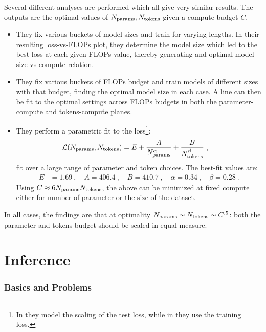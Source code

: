 \documentclass[11pt]{article}
\begin{document}
Several different analyses are performed which all give very similar results. The outputs are the optimal values of $ N _{ {\rm params} }, N _{ {\rm tokens} } $ given a compute budget $ C $.
\begin{itemize}
	\item They fix various buckets of model sizes and train for varying lengths. In their resulting
	      loss-vs-FLOPs plot, they determine the model size which led to the best loss at each given FLOPs value, thereby generating
	      and optimal model size vs compute relation.
	\item They fix various buckets of FLOPs budget and train models of different sizes with that budget,
	      finding the optimal model size in each case. A line can then be fit to the optimal settings across
	      FLOPs budgets in both the parameter-compute and tokens-compute planes.
	\item  They perform a parametric fit to the loss\footnote{In \cite{hoffmann2022training} they model
		      the scaling of the test loss, while in \cite{kaplan2020scaling} they use the training loss.}:
	      \begin{align}
		      \mathcal{L} (N _{ {\rm params} }, N _{ {\rm tokens} }) & =E + \frac{ A }{ N _{ {\rm  params} } ^{ \alpha  } }  + \frac{ B }{ N _{ {\rm tokens} } ^{ \beta  } } \label{eq_chinchilla} \ ,
	      \end{align}
	      fit over a large range of parameter and token choices. The best-fit values are:
	      \begin{align}
		      E & = 1.69 \ , \quad A = 406.4 \ , \quad B = 410.7 \ , \quad  \alpha = 0.34 \ , \quad \beta =0.28 \ .
	      \end{align}
	      Using $ C \approx 6 N _{ {\rm params}} N _{ {\rm tokens} } $, the above can be minimized at fixed compute
	      either for number of parameter or the size of the dataset.
\end{itemize}
In all cases, the findings are that at optimality  $ N _{ {\rm params} }  \sim N _{ {\rm tokens}
		}\sim C ^{ .5 } $: both the parameter and tokens budget should be scaled in equal measure.







\part{Inference}


\section{Basics and Problems}
\end{document}
